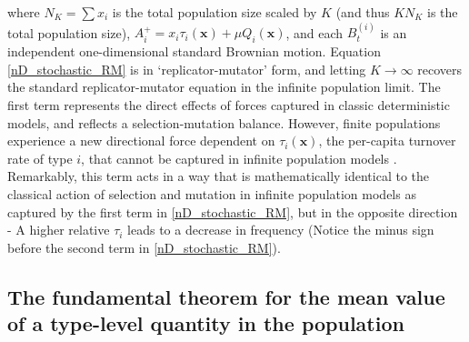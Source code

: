 where $N_K = \sum x_i$ is the total population size scaled by $K$ (and thus $KN_K$ is the total population size), $A_i^{+} = x_i\tau_i(\mathbf{x}) + \mu Q_i(\mathbf{x})$, and each $B^{(i)}_t$ is an independent one-dimensional standard Brownian motion. Equation \eqref{nD_stochastic_RM} is in `replicator-mutator' form, and letting $K \to \infty$ recovers the standard replicator-mutator equation in the infinite population limit. The first term represents the direct effects of forces captured in classic deterministic models, and reflects a selection-mutation balance. However, finite populations experience a new directional force dependent on $\tau_i(\mathbf{x})$, the per-capita turnover rate of type $i$, that cannot be captured in infinite population models \citep{kuosmanen_turnover_2022}. Remarkably, this term acts in a way that is mathematically identical to the classical action of selection and mutation in infinite population models as captured by the first term in \eqref{nD_stochastic_RM}, but in the opposite direction - A higher relative $\tau_i$ leads to a decrease in frequency (Notice the minus sign before the second term in \eqref{nD_stochastic_RM}).
\subsection{The fundamental theorem for the mean value of a type-level quantity in the population}\label{sec_fun_theorems_mean}

